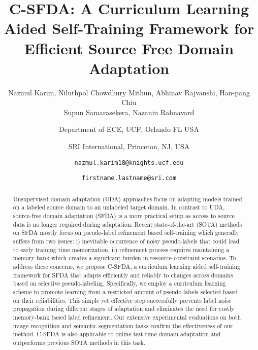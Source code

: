 \documentclass[10pt,twocolumn,letterpaper]{article}
\begin{document}
\title{C-SFDA: A Curriculum Learning Aided Self-Training Framework for Efficient Source Free Domain Adaptation}









\author{
Nazmul Karim,
Niluthpol Chowdhury Mithun,
Abhinav Rajvanshi,  Han-pang Chiu \\ Supun Samarasekera,  Nazanin Rahnavard \and
{\normalsize Department of ECE, UCF, Orlando FL USA} \and {\normalsize SRI International, Princeton, NJ, USA} 
\and
\texttt{\small nazmul.karim18@knights.ucf.edu} \and \texttt{\small firstname.lastname@sri.com}
}

\maketitle

{ \renewcommand{\thefootnote}{\fnsymbol{footnote}}
}


\begin{abstract}


Unsupervised domain adaptation (UDA) approaches focus on adapting models trained on a labeled source domain to an unlabeled target domain. 
In contrast to UDA, source-free domain adaptation (SFDA) is a more practical setup as access to source data is no longer required during adaptation. Recent state-of-the-art (SOTA) methods on SFDA mostly focus on pseudo-label refinement based self-training which generally suffers from two issues: i) inevitable occurrence of noisy pseudo-labels that could lead to early training time memorization, ii) refinement process requires maintaining a memory bank which creates a significant burden in resource constraint scenarios. To address these concerns, we propose C-SFDA, a curriculum learning aided self-training framework for SFDA that adapts efficiently and reliably to changes across domains based on selective pseudo-labeling. Specifically, we employ a curriculum learning scheme to promote learning from a restricted amount of pseudo labels selected based on their reliabilities. This simple yet effective step successfully prevents label noise propagation during different stages of adaptation and eliminates the need for costly memory-bank based label refinement. Our extensive experimental evaluations on both image recognition and semantic segmentation tasks confirm the effectiveness of our method. C-SFDA is also applicable to online test-time domain adaptation and outperforms previous SOTA methods in this task.
\end{abstract}
\end{document}

